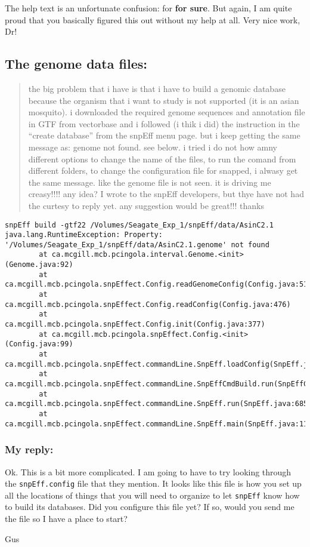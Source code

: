 \documentclass[letterpaper]{scrartcl}
\begin{document}
The help text is an unfortunate confusion: for \textbf{for sure}. But
again, I am quite proud that you basically figured this out without my
help at all. Very nice work, Dr!

\subsection{The genome data files:}\label{the-genome-data-files}

\begin{quote}
the big problem that i have is that i have to build a genomic database
because the organism that i want to study is not supported (it is an
asian mosquito). i downloaded the required genome sequences and
annotation file in GTF from vectorbase and i followed (i thik i did) the
instruction in the ``create database'' from the snpEff menu page. but i
keep getting the same message as: genome not found. see below. i tried i
do not how amny different options to change the name of the files, to
run the comand from different folders, to change the configuration file
for snapped, i alwasy get the same message. like the genome file is not
seen. it is driving me creasy!!!! any idea? I wrote to the snpEff
developers, but thye have not had the curtesy to reply yet. any
suggestion would be great!!! thanks
\end{quote}

\begin{verbatim}
snpEff build -gtf22 /Volumes/Seagate_Exp_1/snpEff/data/AsinC2.1
java.lang.RuntimeException: Property:
'/Volumes/Seagate_Exp_1/snpEff/data/AsinC2.1.genome' not found
        at ca.mcgill.mcb.pcingola.interval.Genome.<init>(Genome.java:92)
        at ca.mcgill.mcb.pcingola.snpEffect.Config.readGenomeConfig(Config.java:513)
        at ca.mcgill.mcb.pcingola.snpEffect.Config.readConfig(Config.java:476)
        at ca.mcgill.mcb.pcingola.snpEffect.Config.init(Config.java:377)
        at ca.mcgill.mcb.pcingola.snpEffect.Config.<init>(Config.java:99)
        at
ca.mcgill.mcb.pcingola.snpEffect.commandLine.SnpEff.loadConfig(SnpEff.java:236)
        at
ca.mcgill.mcb.pcingola.snpEffect.commandLine.SnpEffCmdBuild.run(SnpEffCmdBuild.java:256)
        at ca.mcgill.mcb.pcingola.snpEffect.commandLine.SnpEff.run(SnpEff.java:685)
        at ca.mcgill.mcb.pcingola.snpEffect.commandLine.SnpEff.main(SnpEff.java:118)
\end{verbatim}

\subsubsection{My reply:}\label{my-reply-1}

Ok. This is a bit more complicated. I am going to have to try looking
through the \texttt{snpEff.config} file that they mention. It looks like
this file is how you set up all the locations of things that you will
need to organize to let \texttt{snpEff} know how to build its databases.
Did you configure this file yet? If so, would you send me the file so I
have a place to start?

Gus
\end{document}
